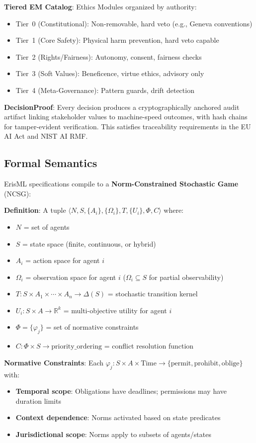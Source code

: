 \documentclass[conference]{IEEEtran}
\begin{document}
\textbf{Tiered EM Catalog}: Ethics Modules organized by authority:
\begin{itemize}
\item Tier~0 (Constitutional): Non-removable, hard veto (e.g., Geneva conventions)
\item Tier~1 (Core Safety): Physical harm prevention, hard veto capable
\item Tier~2 (Rights/Fairness): Autonomy, consent, fairness checks
\item Tier~3 (Soft Values): Beneficence, virtue ethics, advisory only
\item Tier~4 (Meta-Governance): Pattern guards, drift detection
\end{itemize}

\textbf{DecisionProof}: Every decision produces a cryptographically anchored audit artifact linking stakeholder values to machine-speed outcomes, with hash chains for tamper-evident verification. This satisfies traceability requirements in the EU AI Act and NIST AI RMF.

\subsection{Formal Semantics}

ErisML specifications compile to a \textbf{Norm-Constrained Stochastic
Game} (NCSG):

\textbf{Definition}: A tuple $\langle N, S, \{A_i\}, \{\Omega_i\}, T, \{U_i\}, \Phi, C \rangle$ where:
\begin{itemize}
\item $N$ = set of agents
\item $S$ = state space (finite, continuous, or hybrid)
\item $A_i$ = action space for agent $i$
\item $\Omega_i$ = observation space for agent $i$ ($\Omega_i \subseteq S$ for partial observability)
\item $T: S \times A_1 \times \cdots \times A_n \to \Delta(S)$ = stochastic transition kernel
\item $U_i: S \times A \to \mathbb{R}^k$ = multi-objective utility for agent $i$
\item $\Phi = \{\varphi_j\}$ = set of normative constraints
\item $C: \Phi \times S \to \text{priority\_ordering}$ = conflict resolution function
\end{itemize}

\textbf{Normative Constraints}: Each $\varphi_j: S \times A \times \text{Time} \to \{\text{permit}, \text{prohibit}, \text{oblige}\}$ with:
\begin{itemize}
\item \textbf{Temporal scope}: Obligations have deadlines; permissions may have duration limits
\item \textbf{Context dependence}: Norms activated based on state predicates
\item \textbf{Jurisdictional scope}: Norms apply to subsets of agents/states
\end{itemize}
\end{document}
